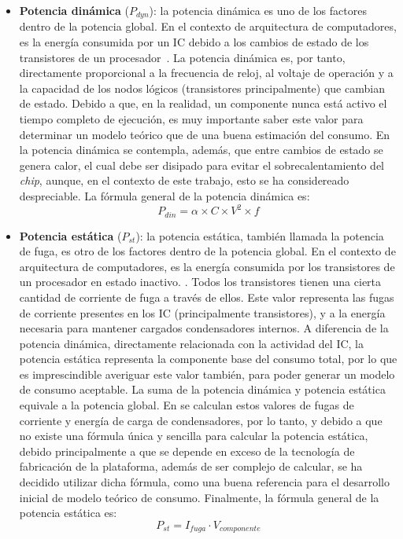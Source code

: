 \begin{itemize}
    \item \textbf{Potencia dinámica} ($P_{dyn}$): la potencia dinámica es uno de los factores dentro de la potencia global. En el contexto de arquitectura de computadores, es la energía consumida por un \ac{IC} debido a los cambios de estado de los transistores de un procesador~\cite{soledadPotencia}. La potencia dinámica es, por tanto,  directamente proporcional a la frecuencia de reloj, al voltaje de operación y a la capacidad de los nodos lógicos (transistores principalmente) que cambian de estado. Debido a que, en la realidad, un componente nunca está activo el tiempo completo de ejecución, es muy importante saber este valor para determinar un modelo teórico que de una buena estimación del consumo. En la potencia dinámica se contempla, además, que entre cambios de estado se genera calor, el cual debe ser disipado para evitar el sobrecalentamiento del \textit{chip}, aunque, en el contexto de este trabajo, esto se ha considereado despreciable. La fórmula general de la potencia dinámica es: \begin{equation}P_{din} = \alpha \times C \times V^2 \times f\end{equation}

    \item \textbf{Potencia estática} ($P_{st}$): la potencia estática, también llamada la potencia de fuga, es otro de los factores dentro de la potencia global. En el contexto de arquitectura de computadores, es la energía consumida por los transistores de un procesador en estado inactivo. \cite{soledadPotencia}. Todos los transistores tienen una cierta cantidad de corriente de fuga a través de ellos. Este valor representa las fugas de corriente presentes en los \ac{IC} (principalmente transistores), y a la energía necesaria para mantener cargados condensadores internos. A diferencia de la potencia dinámica, directamente relacionada con la actividad del \ac{IC}, la potencia estática representa la componente base del consumo total, por lo que es imprescindible averiguar este valor también, para poder generar un modelo de consumo aceptable. La suma de la potencia dinámica y potencia estática equivale a la potencia global. En \cite{soton393728} \cite{soton418538} se calculan estos valores de fugas de corriente y energía de carga de condensadores, por lo tanto, y debido a que no existe una fórmula única y sencilla para calcular la potencia estática, debido principalmente a que se depende en exceso de la tecnología de fabricación de la plataforma, además de ser complejo de calcular, se ha decidido utilizar dicha fórmula, como una buena referencia para el desarrollo inicial de modelo teórico de consumo. Finalmente, la fórmula general de la potencia estática es: \begin{equation} P_{st} = I_{fuga} \cdot V_{componente}\label{eq:potenciaEstatica}\end{equation}
    

\end{itemize}
